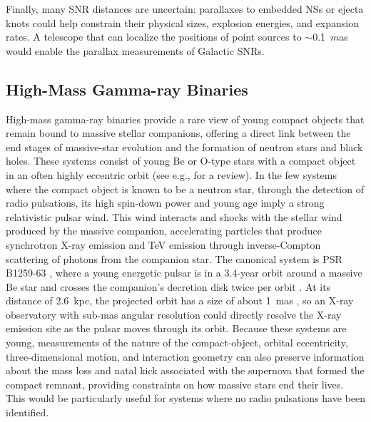\documentclass{article}
\begin{document}
Finally, many SNR distances are uncertain: parallaxes to embedded NSs or ejecta knots could help constrain their physical sizes, explosion energies, and expansion rates. A telescope that can localize the positions of point sources to $\sim$0.1~$m$as would enable the parallax measurements of Galactic SNRs. 


\subsection{High-Mass Gamma-ray Binaries} 
\label{sec:HMGBs}

High-mass gamma-ray binaries provide a rare view of young compact objects that remain bound to massive stellar companions, offering a direct link between the end stages of massive-star evolution and the formation of neutron stars and black holes. These systems consist of young Be or O-type stars with a compact object in an often highly eccentric orbit (see e.g., \cite{2013A&ARv..21...64D} for a review). In the few systems where the compact object is known to be a neutron star, through the detection of radio pulsations, its high spin-down power and young age imply a strong relativistic pulsar wind. This wind interacts and shocks with the stellar wind produced by the massive companion, accelerating particles that produce synchrotron X-ray emission and TeV emission through inverse-Compton scattering of photons from the companion star. The canonical system is PSR B1259-63 \cite{1992ApJ...387L..37J}, where a young energetic pulsar is in a 3.4-year orbit around a massive Be star and crosses the companion's decretion disk twice per orbit \cite{2005MNRAS.358.1069J,2006MNRAS.367.1201C}. At its distance of 2.6~kpc, the projected orbit has a size of about 1~mas \cite{2018MNRAS.479.4849M}, so an X-ray observatory with sub-mas angular resolution could directly resolve the X-ray emission site as the pulsar moves through its orbit. Because these systems are young, measurements of the nature of the compact-object, orbital eccentricity, three-dimensional motion, and interaction geometry can also preserve information about the mass loss and natal kick associated with the supernova that formed the compact remnant, providing constraints on how massive stars end their lives. This would be particularly useful for systems where no radio pulsations have been identified.
\end{document}
